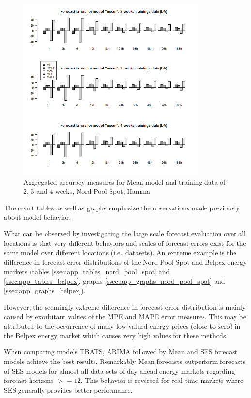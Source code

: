 \begin{figure}[htbp]
	\centering
		\includegraphics[width=0.85\textwidth]{figures/forecasting/da_sim_1_x_1w_1w_mean.png}
	\caption{Aggregated accuracy measures for Mean model and training data of 2, 3 and 4 weeks, Nord Pool Spot, Hamina}
	\label{fig:da_sim_1_x_1w_1w_mean}
\end{figure}


The result tables as well as graphs emphasize the observations made previously about model behavior. 

What can be observed by investigating the large scale forecast evaluation over all locations is that very different behaviors and scales of forecast errors exist for the same model over different locations (i.e.~datasets). An extreme example is the difference in forecast error distributions of the Nord Pool Spot and Belpex energy markets (tables \ref{ssec:app_tables_nord_pool_spot} and \ref{ssec:app_tables_belpex}, graphs \ref{ssec:app_graphs_nord_pool_spot} and \ref{ssec:app_graphs_belpex}). 

However, the seemingly extreme difference in forecast error distribution is mainly caused by exorbitant values of the MPE and MAPE error measures. This may be attributed to the occurrence of many low valued energy prices (close to zero) in the Belpex energy market which causes very high values for these methods. 

When comparing models TBATS, ARIMA followed by Mean and SES forecast models achieve the best results. Remarkably Mean forecasts outperform forecasts of SES models for almost all data sets of day ahead energy markets regarding forecast horizons $>= 12$. This behavior is reversed for real time markets where SES generally provides better performance. 


